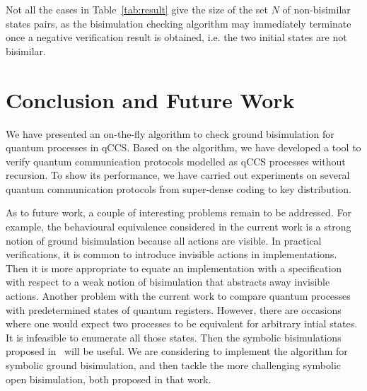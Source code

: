 \documentclass[a4paper,UKenglish,cleveref, autoref]{lipics-v2019}
\begin{document}
 Not all the cases in Table~\ref{tab:result} give the size of the set $N$ of non-bisimilar states pairs, as the bisimulation checking algorithm may immediately terminate once a negative verification result is obtained, i.e. the two initial states are not bisimilar. 

\section{Conclusion and Future Work}\label{sec:con}
We have presented an on-the-fly algorithm to check ground bisimulation for quantum processes in qCCS. Based on the algorithm, we have developed a tool to verify quantum communication protocols modelled as qCCS processes without recursion.  To show its performance, we have carried out experiments on several quantum communication protocols from super-dense coding to key distribution. 

As to future work, a couple of interesting problems remain to be addressed.
For example, the behavioural equivalence considered in the current work is a strong notion of ground bisimulation because all actions are visible. In practical verifications, it is common to introduce invisible actions in implementations. Then it is more appropriate to equate an implementation with a specification with respect to a weak notion of bisimulation that abstracts away invisible actions. Another problem with the current work  to compare quantum processes with predetermined states of quantum registers. However, there are occasions where one would expect two processes to be equivalent for arbitrary  intial states. It is infeasible to enumerate all those states. Then the symbolic bisimulations 
 proposed in~\cite{FDY14} will be useful. We are considering to implement the algorithm for symbolic ground bisimulation, and then tackle the more challenging symbolic open bisimulation, both proposed in that work.
 


%


\appendix
\end{document}

